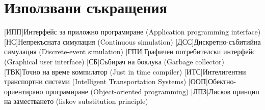\appendix
\chapter{Използвани съкращения}
	\begin{acronym}
		[ИПП]{Интерфейс за приложно програмиране (Application programming interface)}
		[НС]{Непрекъсната симулация (Continuous simulation)}
		[ДСС]{Дискретно-събитийна симулация (Discrete-event simulation)}
		[ГПИ]{Графичен потребителски интерфейс (Graphical user interface)}
		[СБ]{Събирач на боклука (Garbage collector)}
		[ТВК]{Точно на време компилатор (Just in time compiler)}
		[ИТС]{Интелигентни транспортни системи (Intelligent Transportation Systems)}
		[ООП]{Обектно-ориентирано програмиране (Object-oriented programming)}
		[ЛПЗ]{Лисков принцип на заместването (liskov substitution principle)}
	\end{acronym}